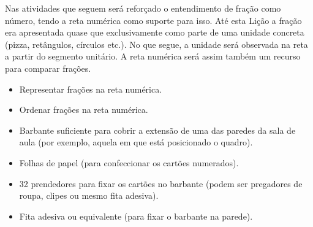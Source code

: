 Nas atividades que seguem será reforçado  o entendimento de fração como número, tendo a reta numérica como suporte para isso. Até esta Lição a fração era apresentada quase que exclusivamente como parte de uma unidade concreta (pizza, retângulos, círculos etc.). No que segue, a unidade será observada na reta a partir do segmento unitário. A reta numérica será assim também um recurso para comparar frações. 

\Bg



\begin{objetivos}[label=chap3-ativ11]{}{}
\begin{itemize} %
  \item     Representar frações na reta numérica. 
  \item     Ordenar frações na reta numérica.
\end{itemize} %

\begin{itemize} %
  \item     Barbante suficiente para cobrir a extensão de uma das paredes da sala de aula (por exemplo, aquela em que está posicionado o quadro).
  \item  Folhas de papel (para confeccionar os cartões numerados).
  \item  32 prendedores para fixar os cartões no barbante (podem ser pregadores de roupa, clipes ou mesmo fita adesiva).
  \item     Fita adesiva ou equivalente (para fixar o barbante na parede).
\end{itemize} %


\end{objetivos}
